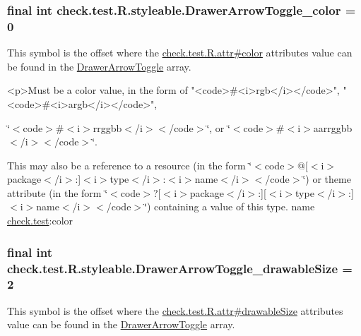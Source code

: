 \subsubsection[{Drawer\+Arrow\+Toggle\+\_\+color}]{\setlength{\rightskip}{0pt plus 5cm}final int check.\+test.\+R.\+styleable.\+Drawer\+Arrow\+Toggle\+\_\+color = 0\hspace{0.3cm}{\ttfamily [static]}}\label{classcheck_1_1test_1_1_r_1_1styleable_aab0db7b5e25645f9ddc44b92a639dfa8}
This symbol is the offset where the \hyperlink{classcheck_1_1test_1_1_r_1_1attr_af9989d7fffc42548bab33bf748aff2e2}{check.\+test.\+R.\+attr\#color} attribute\textquotesingle{}s value can be found in the \hyperlink{classcheck_1_1test_1_1_r_1_1styleable_a3bd2348d01049d5d42d5b7f277abeec9}{Drawer\+Arrow\+Toggle} array.

\begin{DoxyVerb}      <p>Must be a color value, in the form of "<code>#<i>rgb</i></code>", "<code>#<i>argb</i></code>",
\end{DoxyVerb}
 \char`\"{}$<$code$>$\#$<$i$>$rrggbb$<$/i$>$$<$/code$>$\char`\"{}, or \char`\"{}$<$code$>$\#$<$i$>$aarrggbb$<$/i$>$$<$/code$>$\char`\"{}. 

This may also be a reference to a resource (in the form \char`\"{}$<$code$>$@\mbox{[}$<$i$>$package$<$/i$>$\+:\mbox{]}$<$i$>$type$<$/i$>$\+:$<$i$>$name$<$/i$>$$<$/code$>$\char`\"{}) or theme attribute (in the form \char`\"{}$<$code$>$?\mbox{[}$<$i$>$package$<$/i$>$\+:\mbox{]}\mbox{[}$<$i$>$type$<$/i$>$\+:\mbox{]}$<$i$>$name$<$/i$>$$<$/code$>$\char`\"{}) containing a value of this type.  name \hyperlink{namespacecheck_1_1test}{check.\+test}\+:color \hypertarget{classcheck_1_1test_1_1_r_1_1styleable_a4d2ffe9ec6395dfd049a6a31e683caea}{}
\subsubsection[{Drawer\+Arrow\+Toggle\+\_\+drawable\+Size}]{\setlength{\rightskip}{0pt plus 5cm}final int check.\+test.\+R.\+styleable.\+Drawer\+Arrow\+Toggle\+\_\+drawable\+Size = 2\hspace{0.3cm}{\ttfamily [static]}}\label{classcheck_1_1test_1_1_r_1_1styleable_a4d2ffe9ec6395dfd049a6a31e683caea}
This symbol is the offset where the \hyperlink{classcheck_1_1test_1_1_r_1_1attr_a3acddaeb5712641317db75c95a7011af}{check.\+test.\+R.\+attr\#drawable\+Size} attribute\textquotesingle{}s value can be found in the \hyperlink{classcheck_1_1test_1_1_r_1_1styleable_a3bd2348d01049d5d42d5b7f277abeec9}{Drawer\+Arrow\+Toggle} array.

